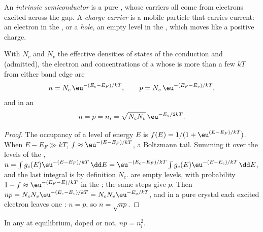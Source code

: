 \begin{definition}[Carriers]\label{def:b3:solid-state:carriers}
An \emph{intrinsic semiconductor} is a pure
, whose carriers all come from electrons excited across the gap. A
\emph{charge carrier} is a mobile particle that carries
current: an electron in the , or a \emph{hole}, an
empty level in the , which moves like a positive charge.
\end{definition}

\begin{theorem}\label{thm:b3:solid-state:intrinsic}
With $N_c$ and $N_v$ the effective densities of states of the conduction and
 (admitted), the electron and  concentrations of a 
whose  is more than a few $kT$ from either band edge are
\[
  n = N_c\,\eu^{-(E_c - E_F)/kT}, \qquad p = N_v\,\eu^{-(E_F - E_v)/kT},
\]
and in an 
\[
  n = p = n_i = \sqrt{N_cN_v}\,\eu^{-E_g/2kT}.
\]
\end{theorem}

\begin{proof}
The occupancy of a level of energy $E$ is $f(E) = 1/(1 + \eu^{(E - E_F)/kT})$. When
$E - E_F \gg kT$, $f \approx \eu^{-(E - E_F)/kT}$, a Boltzmann tail. Summing it over the levels of the , $n = \int g_c(E)\eu^{-(E - E_F)/kT}\,\dd E = \eu^{-(E_c - E_F)/kT}\int g_c(E)\eu^{-(E - E_c)/kT}\,\dd E$, and the last integral is by
definition $N_c$.  are empty levels, with probability $1 - f \approx \eu^{-(E_F - E)/kT}$ in the
; the same steps give $p$. Then $np = N_cN_v\eu^{-(E_c - E_v)/kT} = N_cN_v\eu^{-E_g/kT}$, and in a pure crystal
each excited electron leaves one : $n = p$, so $n = \sqrt{np}$.
\end{proof}

\begin{proposition}\label{prop:b3:solid-state:mass-action}
In any  at equilibrium, doped or not, $np = n_i^2$.
\end{proposition}

